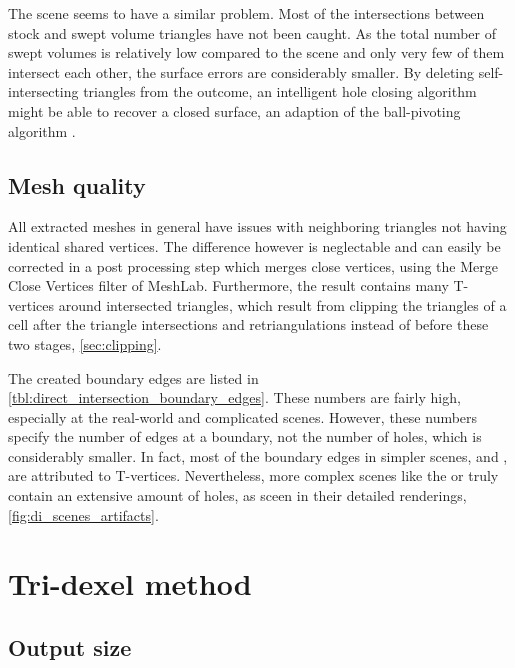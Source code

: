 The \turbine scene seems to have a similar problem.
Most of the intersections between stock and swept volume triangles have not been caught.
As the total number of swept volumes is relatively low compared to the \impeller scene and only very few of them intersect each other, the surface errors are considerably smaller.
By deleting self-intersecting triangles from the outcome, an intelligent hole closing algorithm might be able to recover a closed surface, \eg an adaption of the ball-pivoting algorithm \cite{bpa}.


\subsection{Mesh quality}

All extracted meshes in general have issues with neighboring triangles not having identical shared vertices.
The difference however is neglectable and can easily be corrected in a post processing step which merges close vertices, \eg using the Merge Close Vertices filter of MeshLab.
Furthermore, the result contains many T-vertices around intersected triangles, which result from clipping the triangles of a cell after the triangle intersections and retriangulations instead of before these two stages, \cf \cref{sec:clipping}.

The created boundary edges are listed in \cref{tbl:direct_intersection_boundary_edges}.
These numbers are fairly high, especially at the real-world and complicated scenes.
However, these numbers specify the number of edges at a boundary, not the number of holes, which is considerably smaller.
In fact, most of the boundary edges in simpler scenes, \eg \cylinders and \cylinderhead, are attributed to T-vertices.
Nevertheless, more complex scenes like the \impeller or \turbine truly contain an extensive amount of holes, as sceen in their detailed renderings, \cf \cref{fig:di_scenes_artifacts}.


\section{Tri-dexel method}
\label{sec:tri_dexel_discussion}


\subsection {Output size}
\label{sec:tri_dexel_output_size}

